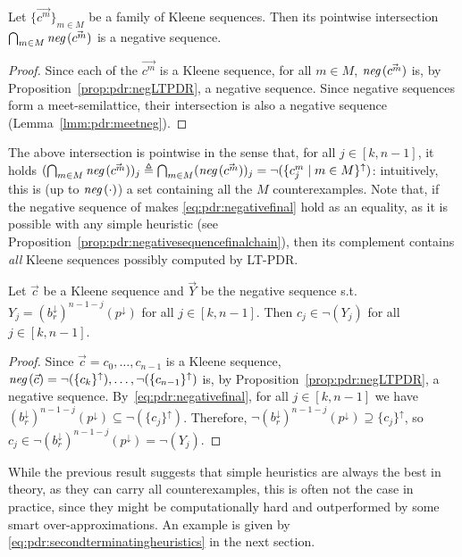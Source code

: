 \begin{prop}\label{prop:pdr:multipleLTPDR}
	Let $\{\vec{c^m}\}_{m\in M}$ be a family of Kleene sequences.
	Then its pointwise intersection $\bigcap_{m\in M} \textit{neg}\,(\vec{c^m})$ is a negative sequence.
\end{prop}
\begin{proof}
	Since each of the $\vec{c^m}$ is a Kleene sequence, for all $m\in M$, $\textit{neg}\,(\vec{c^m})$ is, by Proposition~\ref{prop:pdr:negLTPDR}, a negative sequence.
	Since negative sequences form a meet-semilattice, their intersection is also a negative sequence (Lemma~\ref{lmm:pdr:meetneg}).
\end{proof}

The above intersection is pointwise in the sense that, for all $j\in {[k,n-1]}$, it holds $(\bigcap_{m\in M} \textit{neg}\,(\vec{c^m}))_j \triangleq \bigcap_{m\in M} (\textit{neg}\,(\vec{c^m}))_j = \lnot(\{ c_j^m \mid m \in M \}^{\uparrow})$: intuitively, this is (up to $\textit{neg}\,(\cdot)$) a set containing all the $M$ counterexamples.
Note that, if the negative sequence of {\ADPDR} makes \eqref{eq:pdr:negativefinal} hold as an equality, as it is possible with any simple heuristic (see Proposition~\ref{prop:pdr:negativesequencefinalchain}), then its complement contains \emph{all} Kleene sequences possibly computed by LT-PDR.

\begin{prop}\label{prop:pdr:LTPDRfinal}
	Let $\vec{c}$ be a Kleene sequence and $\vec{Y}$ be the negative sequence s.t. $Y_j= (b_r^\downarrow)^{n-1-j}(p^\downarrow)$ for all $j \in [k,n-1]$.
	Then  $c_j \in \neg(Y_j)$ for all $j \in [k,n-1]$.
\end{prop}
\begin{proof}
	Since $\vec{c} = c_0, \dots, c_{n-1}$ is a Kleene sequence, $\textit{neg}\,(\vec{c}) = \lnot (\{ c_k \}^{\uparrow}), \dots, \lnot (\{ c_{n-1} \}^{\uparrow})$ is, by Proposition~\ref{prop:pdr:negLTPDR}, a negative sequence.
	By~\eqref{eq:pdr:negativefinal}, for all $j \in [k, n - 1]$ we have $(b_r^\downarrow)^{n-1-j}(p^\downarrow) \subseteq  \neg(\{c_j\}^\uparrow)$. Therefore, $\neg (b_r^\downarrow)^{n-1-j}(p^\downarrow) \supseteq \{c_j\}^\uparrow$, so $c_j \in \neg (b_r^\downarrow)^{n-1-j}(p^\downarrow) = \neg (Y_j)$.
\end{proof}

While the previous result suggests that simple heuristics are always the best in theory, as they can carry all counterexamples, this is  often not the case in practice, since they might be computationally hard and outperformed by  some smart over-approximations. An example is given by \eqref{eq:pdr:secondterminatingheuristics} in the next section.

